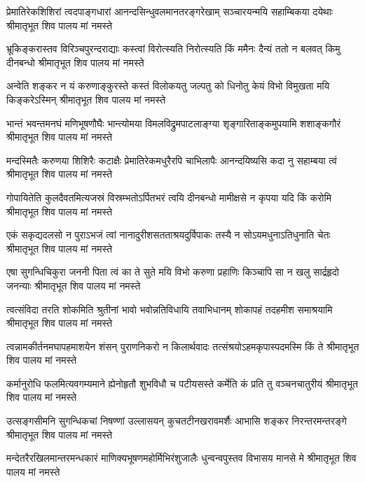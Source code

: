 \fourlineindentedshloka
{प्रेमातिरेकशिशिरां त्वदपाङ्गधारां}
{आनन्दसिन्धुवलमानतरङ्गरेखाम्}
{सञ्चारयन्मयि सहाम्बिकया दयेथाः}
{श्रीमातृभूत शिव पालय मां नमस्ते} %

\fourlineindentedshloka
{भ्रूकिङ्करास्तव विरिञ्चपुरन्दराद्याः}
{कस्त्वां विरोत्स्यति निरोत्स्यति किं ममैनः}
{दैन्यं ततो न बलवत् किमु दीनबन्धो}
{श्रीमातृभूत शिव पालय मां नमस्ते} %

\fourlineindentedshloka
{अन्वेति शङ्कर न यं करुणाङ्कुरस्ते}
{कस्तं विलोकयतु जल्पतु को धिनोतु}
{केयं विभो विमुखता मयि किङ्करेऽस्मिन्}
{श्रीमातृभूत शिव पालय मां नमस्ते}  %

\fourlineindentedshloka
{भान्तं भवन्तमनघं मणिभूषणौघैः}
{भान्त्योमया विमलविद्रुमपाटलाङ्ग्या}
{श‍ृङ्गारिताङ्कमुपयामि शशाङ्कगौरं}
{श्रीमातृभूत शिव पालय मां नमस्ते} %

\fourlineindentedshloka
{मन्दस्मितैः करुणया शिशिरैः कटाक्षैः}
{प्रेमातिरेकमधुरैरपि चाभिलापैः}
{आनन्दयिष्यसि कदा नु सहाम्बया त्वं}
{श्रीमातृभूत शिव पालय मां नमस्ते} %

\fourlineindentedshloka
{गोपायितेति कुलदैवतमित्यजस्रं}
{विस्रम्भतोऽर्पितभरं त्वयि दीनबन्धो}
{मामीक्षसे न कृपया यदि किं करोमि}
{श्रीमातृभूत शिव पालय मां नमस्ते} %

\fourlineindentedshloka
{एकं सकृद्यदलसो न पुराऽभजं त्वां}
{नानादुरीशसतताश्रयदुर्विपाकः}
{तस्यै न सोऽयमधुनाऽतिधुनाति चेतः}
{श्रीमातृभूत शिव पालय मां नमस्ते} %

\fourlineindentedshloka
{एषा सुगन्धिचिकुरा जननी पिता त्वं}
{का ते सुते मयि विभो करुणा प्रहाणिः}
{किञ्चापि सा न खलु सार्द्रहृदो जनन्याः}
{श्रीमातृभूत शिव पालय मां नमस्ते} %

\fourlineindentedshloka
{त्वत्संविदा तरति शोकमिति श्रुतीनां}
{भावो भवोन्नतिविधायि तवाभिधानम्}
{शोकापहं तदहमीश समाश्रयामि}
{श्रीमातृभूत शिव पालय मां नमस्ते} %

\fourlineindentedshloka
{त्वन्नामकीर्तनमघापहमाशयेन}
{शंसन् पुराणनिकरो न किलार्थवादः}
{तत्संश्रयोऽहमकृपास्पदमस्मि किं ते}
{श्रीमातृभूत शिव पालय मां नमस्ते} %

\fourlineindentedshloka
{कर्मानुरोधि फलमित्यवगम्यमाने}
{ह्येनोहृतौ शुभविधौ च पटीयसस्ते}
{कर्मेति कं प्रति तु वञ्चनचातुरीयं}
{श्रीमातृभूत शिव पालय मां नमस्ते} %

\fourlineindentedshloka
{उत्सङ्गसीमनि सुगन्धिकचां निषण्णां}
{उल्लासयन् कुचतटीनखरावमर्शैः}
{आभासि शङ्कर निरन्तरमन्तरङ्गे}
{श्रीमातृभूत शिव पालय मां नमस्ते} %

\fourlineindentedshloka
{मन्देतरैरखिलमान्तरमन्धकारं}
{माणिक्यभूषणमहोर्मिभिरंशुजालैः}
{धुन्वन्वपुस्तव विभासय मानसे मे}
{श्रीमातृभूत शिव पालय मां नमस्ते} %

